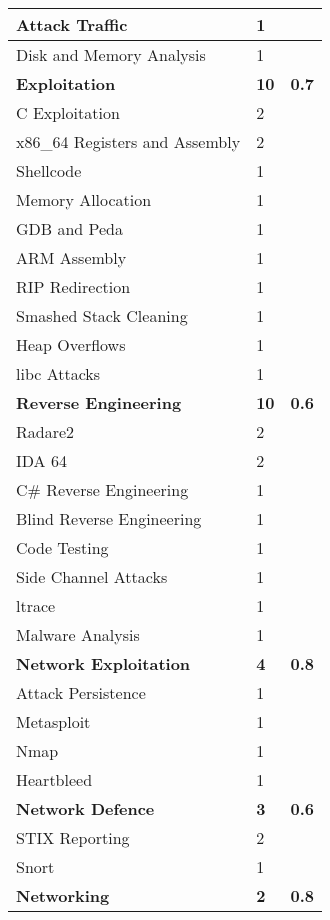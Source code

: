 \documentclass[a4paper,11pt]{report}
\begin{document}
\begin{center}
\begin{longtable}{| l | l | l |}
					\quad Attack Traffic & 1 & \\ \hline 
					\quad Disk and Memory Analysis & 1 & \\ \hline 
					\textbf{Exploitation} & \textbf{10} & \textbf{0.7} \\ \hline
					\quad C Exploitation & 2 & \\ \hline 
					\quad x86\_64 Registers and Assembly & 2 & \\ \hline
					\quad Shellcode & 1 & \\ \hline
					\quad Memory Allocation & 1 & \\ \hline
					\quad GDB and Peda & 1 & \\ \hline
					\quad ARM Assembly & 1 & \\ \hline
					\quad RIP Redirection & 1 & \\ \hline 
					\quad Smashed Stack Cleaning & 1 & \\ \hline 
					\quad Heap Overflows & 1 & \\ \hline 
					\quad libc Attacks & 1 & \\ \hline 
					\textbf{Reverse Engineering} & \textbf{10} & \textbf{0.6}\\ \hline 
					\quad Radare2 & 2 & \\ \hline 
					\quad IDA 64 & 2 & \\ \hline 
					\quad C\# Reverse Engineering & 1 & \\ \hline
					\quad Blind Reverse Engineering & 1 & \\ \hline 
					\quad Code Testing & 1 & \\ \hline 
					\quad Side Channel Attacks & 1 & \\ \hline 
					\quad ltrace & 1 & \\ \hline 
					\quad Malware Analysis & 1 & \\ \hline
					\textbf{Network Exploitation} & \textbf{4} & \textbf{0.8} \\ \hline 
					\quad Attack Persistence & 1 & \\ \hline 
					\quad Metasploit & 1 & \\ \hline 
					\quad Nmap & 1 & \\ \hline 
					\quad Heartbleed & 1 & \\ \hline
					\textbf{Network Defence} & \textbf{3} & \textbf{0.6} \\ \hline
					\quad STIX Reporting & 2 & \\ \hline
					\quad Snort & 1 & \\ \hline
					\textbf{Networking} & \textbf{2} & \textbf{0.8}\\ \hline

\end{longtable}
\end{center}
\end{document}
